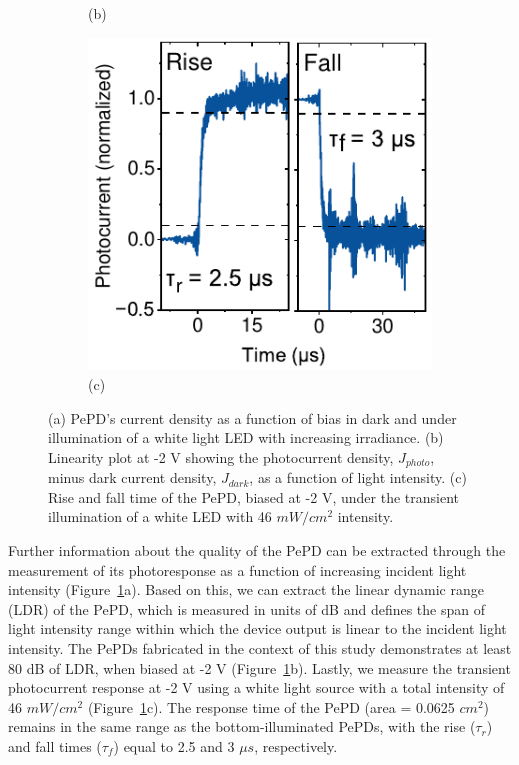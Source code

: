 \begin{figure}[htbp]
\begin{subfigure}[t]{0.29\textwidth}
        \caption*{(b)}
    \end{subfigure}
    \hfill
    \begin{subfigure}[t]{0.29\textwidth}
        \centering
        \includegraphics[width=\textwidth]{chapters/transport_layers/images/TPC_rise_fall.pdf} %
        \caption*{(c)}
    \end{subfigure}
    \caption[Response linearity and response time of top-illuminated PePD.]{(a) PePD's current density as a function of bias in dark and under illumination of a white light LED with increasing irradiance. (b) Linearity plot at -2 V showing the photocurrent density, $J_{photo}$, minus dark current density, $J_{dark}$, as a function of light intensity. (c) Rise and fall time of the PePD, biased at -2 V, under the transient illumination of a white LED with 46 $mW/cm^2$ intensity.}
    \label{fig:etl:linearity_and_tpc}
\end{figure}

Further information about the quality of the PePD can be extracted through the measurement of its photoresponse as a function of increasing incident light intensity (Figure~\ref{fig:etl:linearity_and_tpc}a). Based on this, we can extract the linear dynamic range (LDR) of the PePD, which is measured in units of dB and defines the span of light intensity range within which the device output is linear to the incident light intensity. The PePDs fabricated in the context of this study demonstrates at least 80 dB of LDR, when biased at -2 V (Figure~\ref{fig:etl:linearity_and_tpc}b). Lastly, we measure the transient photocurrent response at -2 V using a white light source with a total intensity of 46 $mW/cm^2$ (Figure~\ref{fig:etl:linearity_and_tpc}c). The response time of the PePD (area = 0.0625 $cm^2$) remains in the same range as the bottom-illuminated PePDs, with the rise ($\tau_r$) and fall times ($\tau_f$) equal to 2.5 and 3 $\mu s$, respectively. 


